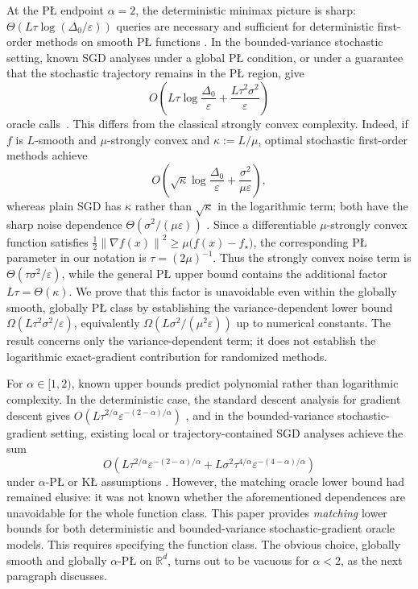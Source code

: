 \documentclass[11pt]{article}
\newcommand{\norm}[1]{\left\lVert #1\right\rVert}
\begin{document}
At the P\L{} endpoint $\alpha=2$, the deterministic minimax picture is sharp:
$\Theta\left(L\tau\log(\Delta_0/\varepsilon)\right)$ queries are necessary and sufficient for deterministic
first-order methods on smooth P\L{} functions
\citep{KarimiNutiniSchmidt2016,YueFangLin2023}. In the bounded-variance stochastic setting, known SGD analyses under a
global P\L{} condition, or under a guarantee that the stochastic trajectory remains in the P\L{} region, give
\[
O\left(
L\tau\log\frac{\Delta_0}{\varepsilon}
+\frac{L\tau^2\sigma^2}{\varepsilon}
\right)
\]
oracle calls~\citep{FatkhullinEtesamiHeKiyavash2022}. This differs from the classical strongly convex complexity.
Indeed, if $f$ is $L$-smooth and $\mu$-strongly convex and $\kappa:=L/\mu$, optimal stochastic first-order methods
achieve
\[
O\left(
\sqrt{\kappa}\log\frac{\Delta_0}{\varepsilon}
+\frac{\sigma^2}{\mu\varepsilon}
\right),
\]
whereas plain SGD has $\kappa$ rather than $\sqrt{\kappa}$ in the logarithmic term; both have the sharp noise
dependence $\Theta(\sigma^2/(\mu\varepsilon))$
\citep{GhadimiLan2013,NemirovskiJuditskyLanShapiro2009,AgarwalBartlettRavikumarWainwright2012}.
Since a differentiable $\mu$-strongly convex function satisfies
$\frac12\norm{\nabla f(x)}^2\ge\mu\bigl(f(x)-f_\star\bigr)$, the corresponding P\L{} parameter in our notation is
$\tau=(2\mu)^{-1}$. Thus the strongly convex
noise term is $\Theta(\tau\sigma^2/\varepsilon)$, while the general P\L{} upper bound contains the additional factor
$L\tau=\Theta(\kappa)$. We prove that this factor is unavoidable even within the globally smooth,
globally P\L{} class by establishing the variance-dependent lower bound
$\Omega(L\tau^2\sigma^2/\varepsilon)$, equivalently
$\Omega(L\sigma^2/(\mu^2\varepsilon))$ up to numerical constants. The result concerns only the variance-dependent term;
it does not establish the logarithmic exact-gradient contribution for randomized methods.

For $\alpha\in[1,2)$, known upper bounds predict polynomial rather than logarithmic complexity. In the deterministic
case, the standard descent analysis for gradient descent gives
$O\left(L\tau^{2/\alpha}\varepsilon^{-(2-\alpha)/\alpha}\right)$
\citep{AttouchBolteRedontSoubeyran2010,BolteSabachTeboulle2014},
and in the bounded-variance stochastic-gradient setting, existing local or trajectory-contained SGD analyses achieve
the sum
\[
O\left(
L\tau^{2/\alpha}\varepsilon^{-(2-\alpha)/\alpha}
 + L\sigma^2\tau^{4/\alpha}\varepsilon^{-(4-\alpha)/\alpha}
\right)
\]
under $\alpha$-P\L{} or K\L{} assumptions
\citep{FatkhullinEtesamiHeKiyavash2022}. However, the matching
oracle lower bound had remained elusive: it was not known whether the aforementioned dependences are unavoidable for
the whole function class. This paper provides \textit{matching} lower
bounds for both deterministic and bounded-variance stochastic-gradient oracle models.
This requires specifying the function class. The obvious choice, globally smooth and globally $\alpha$-P\L{} on $\mathbb{R}^d$, turns out to be vacuous for $\alpha < 2$, as the next paragraph discusses.
\end{document}
